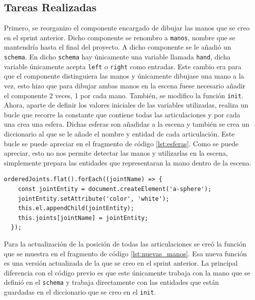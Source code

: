\documentclass[a4paper, 12pt]{book}
\begin{document}
\subsection{Tareas Realizadas}
\label{subsec:implementacion2}
Primero, se reorganizo el componente encargado de dibujar las manos que se creo en el sprint anterior. Dicho componente se renombro a \texttt{manos}, nombre que se mantendría hasta el final del proyecto. A dicho componente se le añadió un \texttt{schema}. 
En dicho \texttt{schema} hay únicamente una variable llamada \texttt{hand}, dicha variable únicamente acepta \texttt{left} o \texttt{right} como entradas. Este cambio era para que el componente distinguiera las manos y únicamente dibujase una mano a la vez, esto hizo que para dibujar ambas manos en la escena fuese necesario añadir el componente 2 veces, 1 por cada mano. 
También, se modifico la función \texttt{init}. Ahora, aparte de definir los valores iniciales de las variables utilizadas, realiza un bucle que recorre la constante que contiene todas las articulaciones y por cada una crea una esfera. Dichas esferas son añadidas a la escena y también se crea un diccionario al que se le añade el nombre y entidad de cada articulación.
Este bucle se puede apreciar en el fragmento de código \ref{lst:esferas}. Como se puede apreciar, esto no nos permite detectar las manos y utilizarlas en la escena, simplemente prepara las entidades que representaran la mano dentro de la escena.

\begin{lstlisting}[caption=Creación de las esferas de las articulaciones, captionpos=b, label=lst:esferas]
  orderedJoints.flat().forEach((jointName) => {
    const jointEntity = document.createElement('a-sphere');
    jointEntity.setAttribute('color', 'white'); 
    this.el.appendChild(jointEntity);
    this.joints[jointName] = jointEntity;
  });
\end{lstlisting}

Para la actualización de la posición de todas las articulaciones se creó la función que se muestra en el fragmento de código \ref{lst:nuevas_manos}. Esa nueva función es una versión actualizada de la que se creo en el sprint anterior. 
La principal diferencia con el código previo es que este únicamente trabaja con la mano que se definió en el \texttt{schema} y trabaja directamente con las entidades que están guardadas en el diccionario que se creo en el \texttt{init}. 
\end{document}
